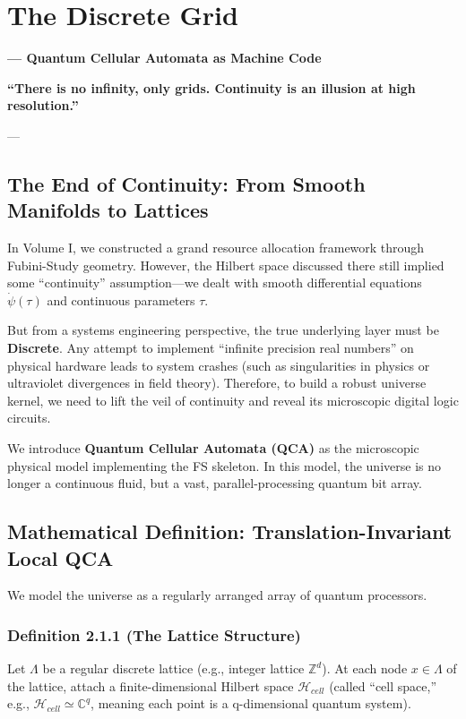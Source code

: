 \documentclass[11pt,a4paper,twoside]{book}
\begin{document}
\chapter{The Discrete Grid}

\textbf{--- Quantum Cellular Automata as Machine Code}

\textbf{``There is no infinity, only grids. Continuity is an illusion at high resolution.''}

---

\section{The End of Continuity: From Smooth Manifolds to Lattices}

In Volume I, we constructed a grand resource allocation framework through Fubini-Study geometry. However, the Hilbert space discussed there still implied some ``continuity'' assumption---we dealt with smooth differential equations \textbf{$\dot{\psi}(\tau)$} and continuous parameters \textbf{$\tau$}.

But from a systems engineering perspective, the true underlying layer must be \textbf{Discrete}. Any attempt to implement ``infinite precision real numbers'' on physical hardware leads to system crashes (such as singularities in physics or ultraviolet divergences in field theory). Therefore, to build a robust universe kernel, we need to lift the veil of continuity and reveal its microscopic digital logic circuits.

We introduce \textbf{Quantum Cellular Automata (QCA)} as the microscopic physical model implementing the FS skeleton. In this model, the universe is no longer a continuous fluid, but a vast, parallel-processing quantum bit array.

\section{Mathematical Definition: Translation-Invariant Local QCA}

We model the universe as a regularly arranged array of quantum processors.

\subsection{Definition 2.1.1 (The Lattice Structure)}

Let \textbf{$\Lambda$} be a regular discrete lattice (e.g., integer lattice \textbf{$\mathbb{Z}^d$}). At each node \textbf{$x \in \Lambda$} of the lattice, attach a finite-dimensional Hilbert space \textbf{$\mathcal{H}_{cell}$} (called ``cell space,'' e.g., \textbf{$\mathcal{H}_{cell} \simeq \mathbb{C}^q$}, meaning each point is a q-dimensional quantum system).
\end{document}
